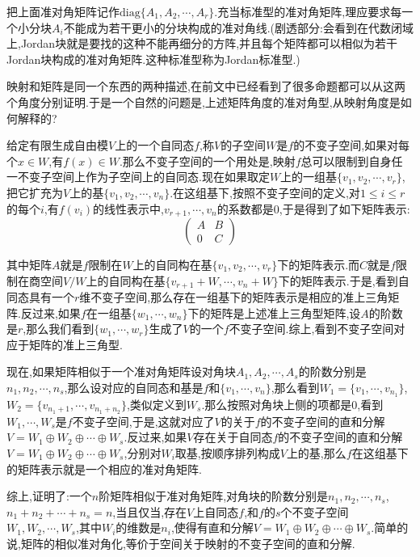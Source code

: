 把上面准对角矩阵记作$\mathrm{diag}\{A_1,A_2,\cdots,A_r\}$.充当标准型的准对角矩阵,理应要求每一个小分块$A_i$不能成为若干更小的分块构成的准对角线.(剧透部分:会看到在代数闭域上,Jordan块就是要找的这种不能再细分的方阵,并且每个矩阵都可以相似为若干Jordan块构成的准对角矩阵.这种标准型称为Jordan标准型.)

映射和矩阵是同一个东西的两种描述,在前文中已经看到了很多命题都可以从这两个角度分别证明.于是一个自然的问题是,上述矩阵角度的准对角型,从映射角度是如何解释的?

给定有限生成自由模$V$上的一个自同态$f$,称$V$的子空间$W$是$f$的不变子空间,如果对每个$x\in W$,有$f(x)\in W$.那么不变子空间的一个用处是,映射$f$总可以限制到自身任一不变子空间上作为子空间上的自同态.现在如果取定$W$上的一组基$\{v_1,v_2,\cdots,v_r\}$,把它扩充为$V$上的基$\{v_1,v_2,\cdots,v_n\}$.在这组基下,按照不变子空间的定义,对$1\le i\le r$的每个$i$,有$f(v_i)$的线性表示中,$v_{r+1},\cdots,v_n$的系数都是0,于是得到了如下矩阵表示:
$$\left(\begin{array}{cc}
A&B\\
0&C\end{array}\right)$$

其中矩阵$A$就是$f$限制在$W$上的自同构在基$\{v_1,v_2,\cdots,v_r\}$下的矩阵表示.而$C$就是$f$限制在商空间$V/W$上的自同构在基$\{v_{r+1}+W,\cdots,v_n+W\}$下的矩阵表示.于是,看到自同态具有一个$r$维不变子空间,那么存在一组基下的矩阵表示是相应的准上三角矩阵.反过来,如果$f$在一组基$\{w_1,\cdots,w_n\}$下的矩阵是上述准上三角型矩阵,设$A$的阶数是$r$,那么我们看到$\{w_1,\cdots,w_r\}$生成了$V$的一个$f$不变子空间.综上,看到不变子空间对应于矩阵的准上三角型.

现在,如果矩阵相似于一个准对角矩阵设对角块$A_1,A_2,\cdots,A_s$的阶数分别是$n_1,n_2,\cdots,n_s$,那么设对应的自同态和基是$f$和$\{v_1,\cdots,v_n\}$,那么看到$W_1=\{v_1,\cdots,v_{n_1}\}$,$W_2=\{v_{n_1+1},\cdots,v_{n_1+n_2}\}$,类似定义到$W_s$.那么按照对角块上侧的项都是0,看到$W_1,\cdots,W_s$是$f$不变子空间,于是,这就对应了$V$的关于$f$的不变子空间的直和分解$V=W_1\oplus W_2\oplus\cdots\oplus W_s$.反过来,如果$V$存在关于自同态$f$的不变子空间的直和分解$V=W_1\oplus W_2\oplus\cdots\oplus W_s$,分别对$W_i$取基,按顺序排列构成$V$上的基,那么$f$在这组基下的矩阵表示就是一个相应的准对角矩阵.

综上,证明了:一个$n$阶矩阵相似于准对角矩阵,对角块的阶数分别是$n_1,n_2,\cdots,n_s$,$n_1+n_2+\cdots+n_s=n$,当且仅当,存在$V$上自同态$f$,和$f$的$s$个不变子空间$W_1,W_2,\cdots,W_s$,其中$W_i$的维数是$n_i$,使得有直和分解$V=W_1\oplus W_2\oplus\cdots\oplus W_s$.简单的说,矩阵的相似准对角化,等价于空间关于映射的不变子空间的直和分解.

